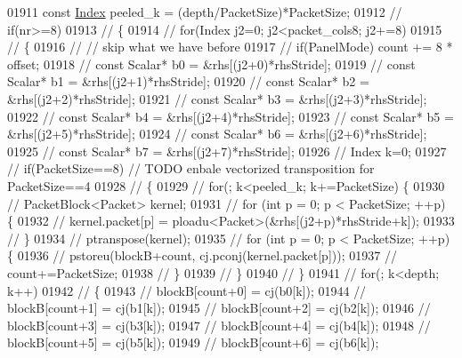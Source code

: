 \begin{DoxyCode}
01911   \textcolor{keyword}{const} \hyperlink{namespace_eigen_a62e77e0933482dafde8fe197d9a2cfde}{Index} peeled\_k = (depth/PacketSize)*PacketSize;
01912 \textcolor{comment}{//   if(nr>=8)}
01913 \textcolor{comment}{//   \{}
01914 \textcolor{comment}{//     for(Index j2=0; j2<packet\_cols8; j2+=8)}
01915 \textcolor{comment}{//     \{}
01916 \textcolor{comment}{//       // skip what we have before}
01917 \textcolor{comment}{//       if(PanelMode) count += 8 * offset;}
01918 \textcolor{comment}{//       const Scalar* b0 = &rhs[(j2+0)*rhsStride];}
01919 \textcolor{comment}{//       const Scalar* b1 = &rhs[(j2+1)*rhsStride];}
01920 \textcolor{comment}{//       const Scalar* b2 = &rhs[(j2+2)*rhsStride];}
01921 \textcolor{comment}{//       const Scalar* b3 = &rhs[(j2+3)*rhsStride];}
01922 \textcolor{comment}{//       const Scalar* b4 = &rhs[(j2+4)*rhsStride];}
01923 \textcolor{comment}{//       const Scalar* b5 = &rhs[(j2+5)*rhsStride];}
01924 \textcolor{comment}{//       const Scalar* b6 = &rhs[(j2+6)*rhsStride];}
01925 \textcolor{comment}{//       const Scalar* b7 = &rhs[(j2+7)*rhsStride];}
01926 \textcolor{comment}{//       Index k=0;}
01927 \textcolor{comment}{//       if(PacketSize==8) // TODO enbale vectorized transposition for PacketSize==4}
01928 \textcolor{comment}{//       \{}
01929 \textcolor{comment}{//         for(; k<peeled\_k; k+=PacketSize) \{}
01930 \textcolor{comment}{//           PacketBlock<Packet> kernel;}
01931 \textcolor{comment}{//           for (int p = 0; p < PacketSize; ++p) \{}
01932 \textcolor{comment}{//             kernel.packet[p] = ploadu<Packet>(&rhs[(j2+p)*rhsStride+k]);}
01933 \textcolor{comment}{//           \}}
01934 \textcolor{comment}{//           ptranspose(kernel);}
01935 \textcolor{comment}{//           for (int p = 0; p < PacketSize; ++p) \{}
01936 \textcolor{comment}{//             pstoreu(blockB+count, cj.pconj(kernel.packet[p]));}
01937 \textcolor{comment}{//             count+=PacketSize;}
01938 \textcolor{comment}{//           \}}
01939 \textcolor{comment}{//         \}}
01940 \textcolor{comment}{//       \}}
01941 \textcolor{comment}{//       for(; k<depth; k++)}
01942 \textcolor{comment}{//       \{}
01943 \textcolor{comment}{//         blockB[count+0] = cj(b0[k]);}
01944 \textcolor{comment}{//         blockB[count+1] = cj(b1[k]);}
01945 \textcolor{comment}{//         blockB[count+2] = cj(b2[k]);}
01946 \textcolor{comment}{//         blockB[count+3] = cj(b3[k]);}
01947 \textcolor{comment}{//         blockB[count+4] = cj(b4[k]);}
01948 \textcolor{comment}{//         blockB[count+5] = cj(b5[k]);}
01949 \textcolor{comment}{//         blockB[count+6] = cj(b6[k]);}

\end{DoxyCode}
